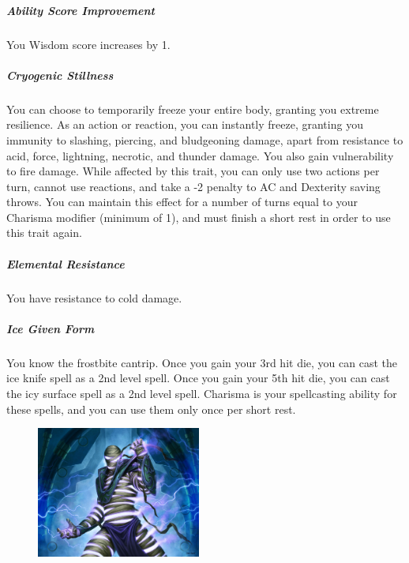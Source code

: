     \subparagraph{Ability Score Improvement} You Wisdom score increases by 1.

    \subparagraph{Cryogenic Stillness} You can choose to temporarily freeze your entire body, granting you extreme resilience.
    As an action or reaction, you can instantly freeze, granting you immunity to slashing, piercing, and bludgeoning damage, apart from resistance to acid, force, lightning, necrotic, and thunder damage.
    You also gain vulnerability to fire damage.
    While affected by this trait, you can only use two actions per turn, cannot use reactions, and take a -2 penalty to AC and Dexterity saving throws.
    You can maintain this effect for a number of turns equal to your Charisma modifier (minimum of 1), and must finish a short rest in order to use this trait again.

    \subparagraph{Elemental Resistance} You have resistance to cold damage.

    \subparagraph{Ice Given Form} You know the frostbite cantrip.
    Once you gain your 3rd hit die, you can cast the ice knife spell as a 2nd level spell.
    Once you gain your 5th hit die, you can cast the icy surface spell as a 2nd level spell.
    Charisma is your spellcasting ability for these spells, and you can use them only once per short rest.

\begin{figure}[!b]
    \centering
    \includegraphics[width=0.48\textwidth]{04kins/img/20zaloth_thunder.jpg}
\end{figure}

